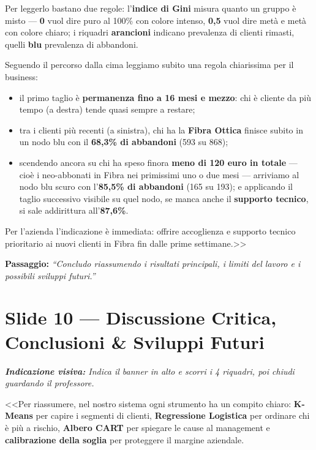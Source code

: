 \documentclass[10pt, a4paper]{article}
\newcommand{\cue}[1]{%
  \par\vspace{1pt}\noindent\colorbox{CueBg}{\parbox{\dimexpr\linewidth-2\fboxsep}{\footnotesize\textit{\color{PrimaryNavy}\textbf{Indicazione visiva:} #1}}}\par\vspace{2pt}%
}
\newcommand{\transition}[1]{%
  \par\vspace{1pt}\noindent\colorbox{LightBg}{\parbox{\dimexpr\linewidth-2\fboxsep}{\small\textbf{\color{SecondaryBlue}Passaggio:} \textit{``#1''}}}\par\vspace{2pt}%
}
\begin{document}
Per leggerlo bastano due regole: l'\textbf{indice di Gini} misura quanto un gruppo è misto --- \textbf{0} vuol dire puro al 100\% con colore intenso, \textbf{0,5} vuol dire metà e metà con colore chiaro; i riquadri \textbf{arancioni} indicano prevalenza di clienti rimasti, quelli \textbf{blu} prevalenza di abbandoni.

Seguendo il percorso dalla cima leggiamo subito una regola chiarissima per il business:
\begin{itemize}
    \item il primo taglio è \textbf{permanenza fino a 16 mesi e mezzo}: chi è cliente da più tempo (a destra) tende quasi sempre a restare;
    \item tra i clienti più recenti (a sinistra), chi ha la \textbf{Fibra Ottica} finisce subito in un nodo blu con il \textbf{68,3\% di abbandoni} (593 su 868);
    \item scendendo ancora su chi ha speso finora \textbf{meno di 120 euro in totale} --- cioè i neo-abbonati in Fibra nei primissimi uno o due mesi --- arriviamo al nodo blu scuro con l'\textbf{85,5\% di abbandoni} (165 su 193); e applicando il taglio successivo visibile su quel nodo, se manca anche il \textbf{supporto tecnico}, si sale addirittura all'\textbf{87,6\%}.
\end{itemize}
Per l'azienda l'indicazione è immediata: offrire accoglienza e supporto tecnico prioritario ai nuovi clienti in Fibra fin dalle prime settimane.>>
\transition{Concludo riassumendo i risultati principali, i limiti del lavoro e i possibili sviluppi futuri.}

\section*{Slide 10 --- Discussione Critica, Conclusioni \& Sviluppi Futuri}
\cue{Indica il banner in alto e scorri i 4 riquadri, poi chiudi guardando il professore.}
\noindent <<Per riassumere, nel nostro sistema ogni strumento ha un compito chiaro: \textbf{K-Means} per capire i segmenti di clienti, \textbf{Regressione Logistica} per ordinare chi è più a rischio, \textbf{Albero CART} per spiegare le cause al management e \textbf{calibrazione della soglia} per proteggere il margine aziendale.
\end{document}
